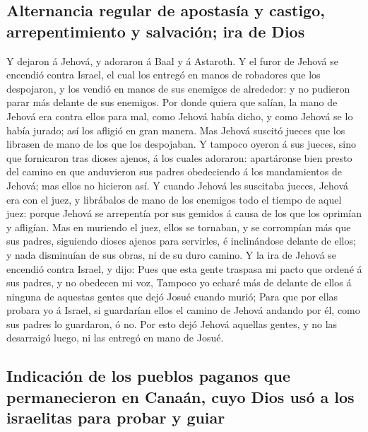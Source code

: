 \hypertarget{alternancia-regular-de-apostasuxeda-y-castigo-arrepentimiento-y-salvaciuxf3n-ira-de-dios}{%
\subsection{Alternancia regular de apostasía y castigo, arrepentimiento
y salvación; ira de
Dios}\label{alternancia-regular-de-apostasuxeda-y-castigo-arrepentimiento-y-salvaciuxf3n-ira-de-dios}}

 Y dejaron á Jehová, y adoraron á Baal y á Astaroth.
 Y el furor de Jehová se encendió contra Israel, el cual
los entregó en manos de robadores que los despojaron, y los vendió en
manos de sus enemigos de alrededor: y no pudieron parar más delante de
sus enemigos.  Por donde quiera que salían, la mano de
Jehová era contra ellos para mal, como Jehová había dicho, y como Jehová
se lo había jurado; así los afligió en gran manera.  Mas
Jehová suscitó jueces que los librasen de mano de los que los
despojaban.  Y tampoco oyeron á sus jueces, sino que
fornicaron tras dioses ajenos, á los cuales adoraron: apartáronse bien
presto del camino en que anduvieron sus padres obedeciendo á los
mandamientos de Jehová; mas ellos no hicieron así.  Y
cuando Jehová les suscitaba jueces, Jehová era con el juez, y librábalos
de mano de los enemigos todo el tiempo de aquel juez: porque Jehová se
arrepentía por sus gemidos á causa de los que los oprimían y afligían.
 Mas en muriendo el juez, ellos se tornaban, y se
corrompían más que sus padres, siguiendo dioses ajenos para servirles, é
inclinándose delante de ellos; y nada disminuían de sus obras, ni de su
duro camino.  Y la ira de Jehová se encendió contra Israel,
y dijo: Pues que esta gente traspasa mi pacto que ordené á sus padres, y
no obedecen mi voz,  Tampoco yo echaré más de delante de
ellos á ninguna de aquestas gentes que dejó Josué cuando murió;
 Para que por ellas probara yo á Israel, si guardarían
ellos el camino de Jehová andando por él, como sus padres lo guardaron,
ó no.  Por esto dejó Jehová aquellas gentes, y no las
desarraigó luego, ni las entregó en mano de Josué.

\hypertarget{indicaciuxf3n-de-los-pueblos-paganos-que-permanecieron-en-canauxe1n-cuyo-dios-usuxf3-a-los-israelitas-para-probar-y-guiar}{%
\subsection{Indicación de los pueblos paganos que permanecieron en
Canaán, cuyo Dios usó a los israelitas para probar y
guiar}\label{indicaciuxf3n-de-los-pueblos-paganos-que-permanecieron-en-canauxe1n-cuyo-dios-usuxf3-a-los-israelitas-para-probar-y-guiar}}


